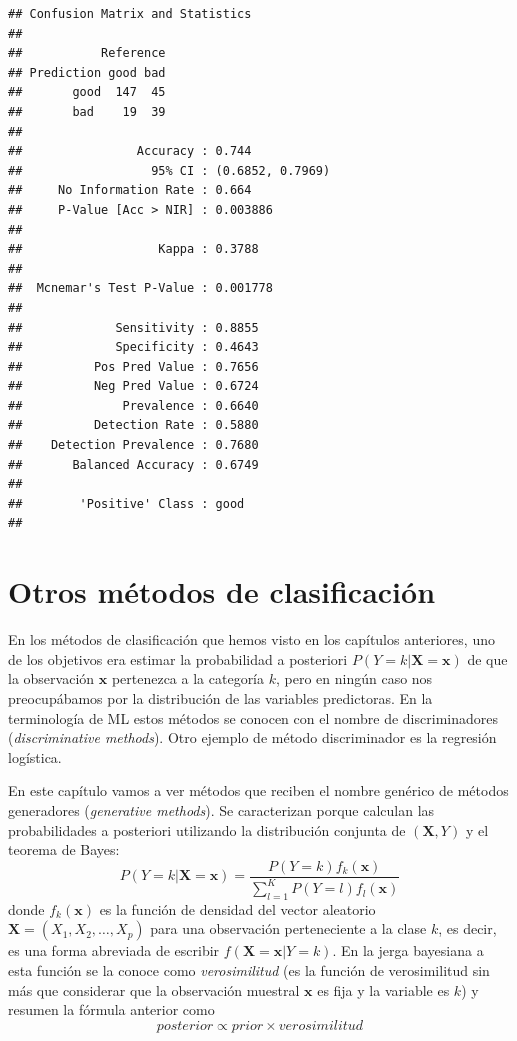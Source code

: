 \documentclass[
]{book}
\theoremstyle{break}
\theoremstyle{definition}
\theoremstyle{definition}
\theoremstyle{definition}
\theoremstyle{definition}
\theoremstyle{remark}
\begin{document}
\begin{verbatim}
## Confusion Matrix and Statistics
## 
##           Reference
## Prediction good bad
##       good  147  45
##       bad    19  39
##                                           
##                Accuracy : 0.744           
##                  95% CI : (0.6852, 0.7969)
##     No Information Rate : 0.664           
##     P-Value [Acc > NIR] : 0.003886        
##                                           
##                   Kappa : 0.3788          
##                                           
##  Mcnemar's Test P-Value : 0.001778        
##                                           
##             Sensitivity : 0.8855          
##             Specificity : 0.4643          
##          Pos Pred Value : 0.7656          
##          Neg Pred Value : 0.6724          
##              Prevalence : 0.6640          
##          Detection Rate : 0.5880          
##    Detection Prevalence : 0.7680          
##       Balanced Accuracy : 0.6749          
##                                           
##        'Positive' Class : good            
## 
\end{verbatim}

\hypertarget{class-otros}{%
\chapter{Otros métodos de clasificación}\label{class-otros}}

En los métodos de clasificación que hemos visto en los capítulos anteriores, uno de los objetivos era estimar la probabilidad a posteriori \(P(Y = k | \mathbf{X}=\mathbf{x})\) de que la observación \(\mathbf{x}\) pertenezca a la categoría \(k\), pero en ningún caso nos preocupábamos por la distribución de las variables predictoras. En la terminología de ML estos métodos se conocen con el nombre de discriminadores (\emph{discriminative methods}). Otro ejemplo de método discriminador es la regresión logística.

En este capítulo vamos a ver métodos que reciben el nombre genérico de métodos generadores (\emph{generative methods}). Se caracterizan porque calculan las probabilidades a posteriori utilizando la distribución conjunta de \((\mathbf{X}, Y)\) y el teorema de Bayes:
\[P(Y = k | \mathbf{X}=\mathbf{x}) = \frac{P(Y = k) f_k(\mathbf{x})}{\sum_{l=1}^K P(Y = l) f_l(\mathbf{x})}\]
donde \(f_k(\mathbf{x})\) es la función de densidad del vector aleatorio \(\mathbf{X}=(X_1, X_2, \ldots, X_p)\) para una observación perteneciente a la clase \(k\), es decir, es una forma abreviada de escribir \(f(\mathbf{X}=\mathbf{x} | Y = k)\). En la jerga bayesiana a esta función se la conoce como \emph{verosimilitud} (es la función de verosimilitud sin más que considerar que la observación muestral \(\mathbf{x}\) es fija y la variable es \(k\)) y resumen la fórmula anterior como
\[posterior \propto prior \times verosimilitud\]
\end{document}
